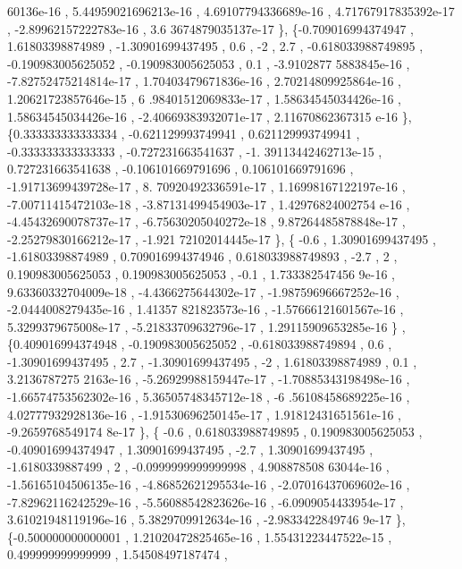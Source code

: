 \begin{DoxyCode}
      60136e-16 , 5.44959021696213e-16 , 4.69107794336689e-16 , 4.71767917835392e-17 , -2.89962157222783e-16 , 3.6
      3674879035137e-17 \},
\{-0.709016994374947 ,  1.61803398874989 , -1.30901699437495 ,               0.6 ,                -2 ,      
               2.7 , -0.618033988749895 , -0.190983005625052 , -0.190983005625053 ,               0.1 , -3.9102877
      5883845e-16 , -7.82752475214814e-17 , 1.70403479671836e-16 , 2.70214809925864e-16 , 1.20621723857646e-15 , 6
      .98401512069833e-17 , 1.58634545034426e-16 , 1.58634545034426e-16 , -2.40669383932071e-17 , 2.11670862367315
      e-16 \},
\{0.333333333333334 , -0.621129993749941 , 0.621129993749941 , -0.333333333333333 , -0.727231663541637 , -1.
      39113442462713e-15 , 0.727231663541638 , -0.106101669791696 , 0.106101669791696 , -1.91713699439728e-17 , 8.
      70920492336591e-17 , 1.16998167122197e-16 , -7.00711415472103e-18 , -3.87131499454903e-17 , 1.42976824002754
      e-16 , -4.45432690078737e-17 , -6.75630205040272e-18 , 9.87264485878848e-17 , -2.25279830166212e-17 , -1.921
      72102014445e-17 \},
\{             -0.6 ,  1.30901699437495 , -1.61803398874989 , 0.709016994374946 , 0.618033988749893 ,       
             -2.7 ,                 2 , 0.190983005625053 , 0.190983005625053 ,              -0.1 , 1.733382547456
      9e-16 , 9.63360332704009e-18 , -4.4366275644302e-17 , -1.98759696667252e-16 , -2.0444008279435e-16 , 1.41357
      821823573e-16 , -1.57666121601567e-16 , 5.3299379675008e-17 , -5.21833709632796e-17 , 1.29115909653285e-16 \}
      ,
\{0.409016994374948 , -0.190983005625052 , -0.618033988749894 ,               0.6 , -1.30901699437495 ,     
                2.7 , -1.30901699437495 ,                -2 ,  1.61803398874989 ,               0.1 , 3.2136787275
      2163e-16 , -5.26929988159447e-17 , -1.70885343198498e-16 , -1.66574753562302e-16 , 5.36505748345712e-18 , -6
      .56108458689225e-16 , 4.02777932928136e-16 , -1.91530696250145e-17 , 1.91812431651561e-16 , -9.2659768549174
      8e-17 \},
\{             -0.6 , 0.618033988749895 , 0.190983005625053 , -0.409016994374947 ,  1.30901699437495 ,      
              -2.7 ,  1.30901699437495 ,  -1.6180339887499 ,                 2 , -0.0999999999999998 , 4.908878508
      63044e-16 , -1.56165104506135e-16 , -4.86852621295534e-16 , -2.07016437069602e-16 , -7.82962116242529e-16 , 
      -5.56088542823626e-16 , -6.0909054433954e-17 , 3.61021948119196e-16 , 5.3829709912634e-16 , -2.9833422849746
      9e-17 \},
\{-0.500000000000001 , 1.21020472825465e-16 , 1.55431223447522e-15 , 0.499999999999999 ,  1.54508497187474 ,

\end{DoxyCode}
